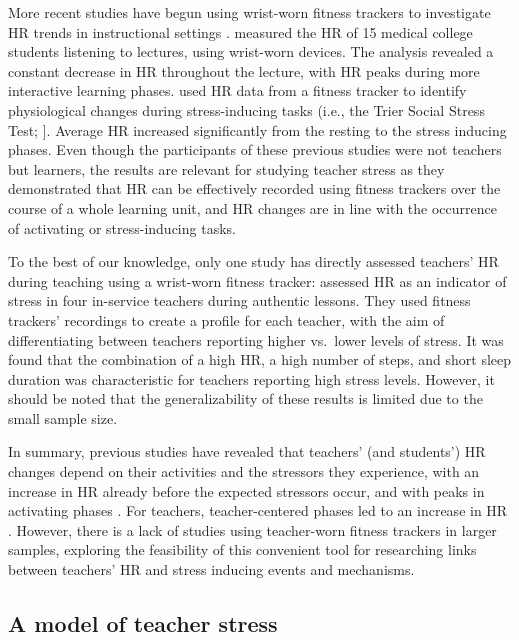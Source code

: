 \documentclass[preprint, 3p,
authoryear]{elsarticle} %
\begin{document}
More recent studies have begun using wrist-worn fitness trackers to
investigate HR trends in instructional settings
\citep{Darnell2019, chalmers2021}. \citet{Darnell2019} measured the HR
of 15 medical college students listening to lectures, using wrist-worn
devices. The analysis revealed a constant decrease in HR throughout the
lecture, with HR peaks during more interactive learning phases.
\citet{chalmers2021} used HR data from a fitness tracker to identify
physiological changes during stress-inducing tasks (i.e., the Trier
Social Stress Test; \citet{kirschbaum1993trier}{]}. Average HR increased
significantly from the resting to the stress inducing phases. Even
though the participants of these previous studies
\citep{Darnell2019, chalmers2021} were not teachers but learners, the
results are relevant for studying teacher stress as they demonstrated
that HR can be effectively recorded using fitness trackers over the
course of a whole learning unit, and HR changes are in line with the
occurrence of activating or stress-inducing tasks.

To the best of our knowledge, only one study has directly assessed
teachers' HR during teaching using a wrist-worn fitness tracker:
\citet{runge2020} assessed HR as an indicator of stress in four
in-service teachers during authentic lessons. They used fitness
trackers' recordings to create a profile for each teacher, with the aim
of differentiating between teachers reporting higher vs.~lower levels of
stress. It was found that the combination of a high HR, a high number of
steps, and short sleep duration was characteristic for teachers
reporting high stress levels. However, it should be noted that the
generalizability of these results is limited due to the small sample
size.

In summary, previous studies have revealed that teachers' (and
students') HR changes depend on their activities and the stressors they
experience, with an increase in HR already before the expected stressors
occur, and with peaks in activating phases
\citep{Darnell2019, chalmers2021}. For teachers, teacher-centered phases
led to an increase in HR
\citep{sperka1995, scheuch1997psychophysische, donker2018, junker2021}.
However, there is a lack of studies using teacher-worn fitness trackers
in larger samples, exploring the feasibility of this convenient tool for
researching links between teachers' HR and stress inducing events and
mechanisms.

\subsection{A model of teacher stress}\label{a-model-of-teacher-stress}
\end{document}
